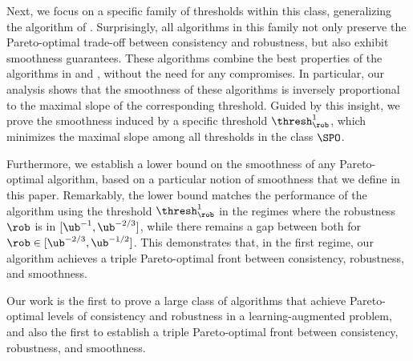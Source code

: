 Next, we focus on a specific family of thresholds within this class, generalizing the algorithm of \cite{sun_pareto-optimal_2021}. Surprisingly, all algorithms in this family not only preserve the Pareto-optimal trade-off between consistency and robustness, but also exhibit smoothness guarantees. These algorithms combine the best properties of the algorithms in \citet{sun_pareto-optimal_2021} and \citet{benomar2025tradeoffs}, without the need for any compromises.
In particular, our analysis shows that the smoothness of these algorithms is inversely proportional to the maximal slope of the corresponding threshold. Guided by this insight, we prove the smoothness induced by a specific threshold $\thresh^1_\rob$, which minimizes the maximal slope among all thresholds in the class $\SPO$.

Furthermore, we establish a lower bound on the smoothness of any Pareto-optimal algorithm, based on a particular notion of smoothness that we define in this paper. Remarkably, the lower bound matches the performance of the algorithm using the threshold $\thresh^1_\rob$ in the regimes where the robustness $\rob$ is in $[\ub^{-1}, \ub^{-2/3}]$, while there remains a gap between both for $\rob \in [\ub^{-2/3}, \ub^{-1/2}]$. This demonstrates that, in the first regime, our algorithm achieves a triple Pareto-optimal front between consistency, robustness, and smoothness.

Our work is the first to prove a large class of algorithms that achieve Pareto-optimal levels of consistency and robustness in a learning-augmented problem, and also the first to establish a triple Pareto-optimal front between consistency, robustness, and smoothness.



